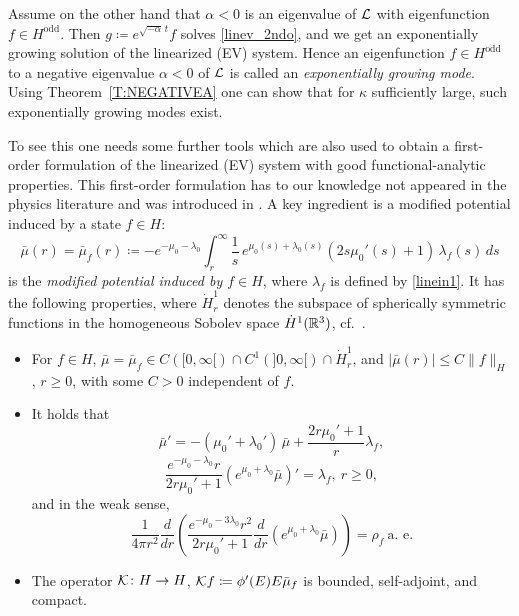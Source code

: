 \documentclass[11pt]{article}
\begin{document}
Assume on the other hand that $\alpha<0$ is an eigenvalue of ${\cal L}$
with eigenfunction $f \in H^\mathrm{odd}$.
Then $g \coloneqq e^{\sqrt{-\alpha}\, t} f$  solves \eqref{linev_2ndo}, 
and we get an exponentially growing solution of the linearized (EV) system.
Hence an eigenfunction  $f \in H^\mathrm{odd}$ to a
negative eigenvalue $\alpha<0$ of ${\cal L}$ is called an
{\em exponentially growing mode}.
Using Theorem~\ref{T:NEGATIVEA} one can show that
for $\kappa$ sufficiently large, such exponentially growing modes exist.

To see this one needs some further tools which are also used to obtain
a first-order formulation of the linearized (EV) system with good
functional-analytic properties. This first-order formulation has to our
knowledge not appeared in the physics literature and was introduced in
\cite{HaLinRe}.
A key ingredient is a modified potential
induced by a state $f\in H$:
\begin{equation}\label{mubardef}
\bar\mu(r) = \bar\mu_f(r)
\coloneqq - e^{-\mu_0-\lambda_0}\int_r^\infty \frac1s\,
e^{\mu_0(s)+\lambda_0(s)}(2s\mu_0'(s)+1)\,\lambda_f(s)\,ds
\end{equation}
is the {\em modified potential induced by $f\in H$}, where
$\lambda_f$ is defined by \eqref{linein1}. It has the following properties,
where $\dot H^1_r$ denotes the subspace of spherically symmetric functions in
the homogeneous Sobolev space $\dot H^1(\mathbb R^3)$, cf.~\cite{Ge1998}.
%
%
\begin{lemma} \label{mubarlemma}
  \begin{itemize}
  \item[(a)]
    For $f\in H$,
    $\bar\mu=\bar\mu_f \in C([0,\infty[)\cap C^1(]0,\infty[)\cap \dot H^1_r$,
    and $|\bar \mu (r)| \leq C \| f\|_H$, $r\geq 0$, with some $C>0$ independent
    of $f$.
  \item[(b)]
    It holds that
    \begin{equation} \label{mubarder}
      \bar \mu' = - (\mu_0' + \lambda_0') \, \bar \mu
      + \frac{2r\mu_0' +1}{r} \lambda_f,
    \end{equation}
    \begin{equation}\label{mubareq1}
      \frac{e^{-\mu_0-\lambda_0}r}{2r\mu_0'+1}(e^{\mu_0+\lambda_0} \bar\mu)'
      = \lambda_f,
      \ r\geq 0,
    \end{equation}
    and in the weak sense,
    \begin{equation}\label{mubareq2}
      \frac{1}{4\pi r^2}
      \frac{d}{dr}\left(\frac{e^{-\mu_0-3\lambda_0}r^2}{2r\mu_0'+1}
      \frac{d}{dr}\left(e^{\mu_0+\lambda_0} \bar\mu\right)\right) =
      \rho_f \ \mbox{a.~e.}
    \end{equation}
  \item[(c)]
    The operator ${\cal K}\colon H\to H$, ${\cal K} f\coloneqq \phi'(E)E \bar\mu_f$
    is bounded, self-adjoint, and compact.
\end{itemize}
\end{lemma}
\end{document}
